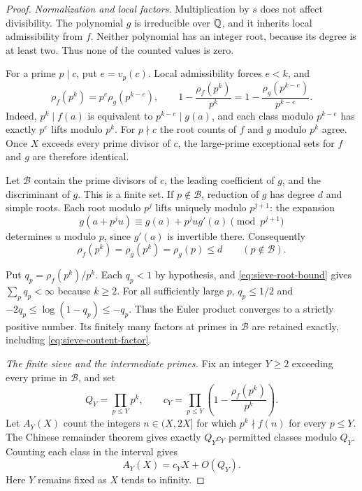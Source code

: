 \begin{proof}
\emph{Normalization and local factors.}
Multiplication by $s$ does not affect divisibility. The polynomial $g$
is irreducible over $\mathbb Q$, and it inherits local admissibility from $f$.
Neither polynomial has an integer root, because its degree is at least
two. Thus none of the counted values is zero.

For a prime $p\mid c$, put $e=v_p(c)$. Local admissibility forces $e<k$,
and
\begin{equation}
 \rho_f(p^k)=p^e\rho_g(p^{k-e}),\qquad
 1-\frac{\rho_f(p^k)}{p^k}
 =1-\frac{\rho_g(p^{k-e})}{p^{k-e}}.
 \label{eq:sieve-content-factor}
\end{equation}
Indeed, $p^k\mid f(a)$ is equivalent to $p^{k-e}\mid g(a)$, and each
class modulo $p^{k-e}$ has exactly $p^e$ lifts modulo $p^k$.
For $p\nmid c$ the root counts of $f$ and $g$ modulo $p^k$ agree.
Once $X$ exceeds every prime divisor of $c$, the large-prime exceptional
sets for $f$ and $g$ are therefore identical.

Let $\mathcal B$ contain the prime divisors of $c$, the leading coefficient
of $g$, and the discriminant of $g$. This is a finite set. If
$p\notin\mathcal B$, reduction of $g$ has degree $d$ and simple roots.
Each root modulo $p^j$ lifts uniquely modulo $p^{j+1}$: the expansion
\[
 g(a+p^j u)\equiv g(a)+p^j u g'(a)\pmod{p^{j+1}}
\]
determines $u$ modulo $p$, since $g'(a)$ is invertible there. Consequently
\begin{equation}
 \rho_f(p^k)=\rho_g(p^k)=\rho_g(p)\le d
 \qquad(p\notin\mathcal B).
 \label{eq:sieve-root-bound}
\end{equation}

Put $q_p=\rho_f(p^k)/p^k$. Each $q_p<1$ by hypothesis, and
\eqref{eq:sieve-root-bound} gives $\sum_p q_p<\infty$ because $k\ge2$.
For all sufficiently large $p$, $q_p\le1/2$ and
$-2q_p\le\log(1-q_p)\le-q_p$. Thus the Euler product converges to a
strictly positive number. Its finitely many factors at primes in
$\mathcal B$ are retained exactly, including
\eqref{eq:sieve-content-factor}.

\emph{The finite sieve and the intermediate primes.}
Fix an integer $Y\ge2$ exceeding every prime in $\mathcal B$, and set
\[
 Q_Y=\prod_{p\le Y}p^k,\qquad
 c_Y=\prod_{p\le Y}\left(1-\frac{\rho_f(p^k)}{p^k}\right).
\]
Let $A_Y(X)$ count the integers $n\in(X,2X]$ for which
$p^k\nmid f(n)$ for every $p\le Y$. The Chinese remainder theorem gives
exactly $Q_Yc_Y$ permitted classes modulo $Q_Y$. Counting each class in
the interval gives
\begin{equation}
 A_Y(X)=c_YX+O(Q_Y).
 \label{eq:sieve-finite-crt}
\end{equation}
Here $Y$ remains fixed as $X$ tends to infinity.


\end{proof}
